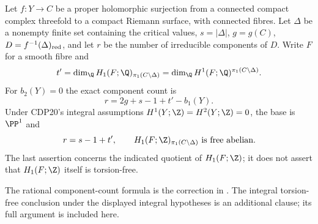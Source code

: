 
\begin{proposition}\label{cdp:st:D.1.2}
Let $f:Y\to C$ be a proper holomorphic surjection from a connected
compact complex threefold to a compact Riemann surface, with
connected fibres. Let $\Delta$ be a nonempty finite set containing
the critical values, $s=|\Delta|$, $g=g(C)$,
$D=f^{-1}(\Delta)_{\rm red}$, and let $r$ be the number of
irreducible components of $D$. Write $F$ for a smooth fibre and
\[
t'=\dim_{\Q}H_1(F;\Q)_{\pi_1(C\setminus\Delta)}
   =\dim_{\Q}H^1(F;\Q)^{\pi_1(C\setminus\Delta)}.
\]
For $b_2(Y)=0$ the exact component count is
\[
\boxed{\quad r=2g+s-1+t'-b_1(Y).\quad}
\]
Under CDP20's integral assumptions
$H^1(Y;\Z)=H^2(Y;\Z)=0$, the base is $\PP^1$ and
\[
r=s-1+t',\qquad
H_1(F;\Z)_{\pi_1(C\setminus\Delta)}\text{ is free abelian}.
\]
The last assertion concerns the indicated quotient of $H_1(F;\Z)$;
it does not assert that $H_1(F;\Z)$ itself is torsion-free.
\end{proposition}

The rational component-count formula is the correction in \citet[Section~10.5, p.~91]{AC2026}. The integral torsion-free conclusion under the displayed integral hypotheses is an additional clause; its full argument is included here.

